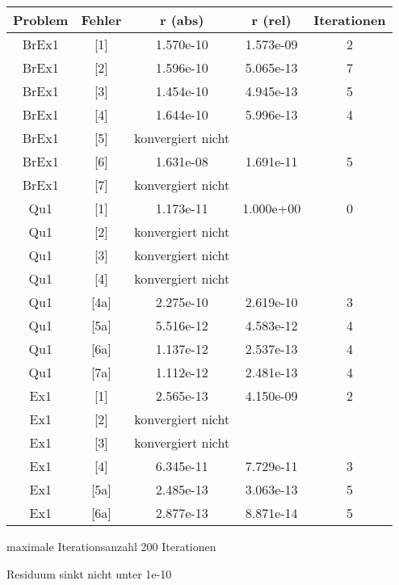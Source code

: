 \documentclass[a4paper,11pt]{article}
\begin{document}
\begin{tabular}{ccccc}
Problem & Fehler &  r (abs) & r (rel) & Iterationen  \\ 
\hline
BrEx1   & [1]    & 1.570e-10 & 1.573e-09 & 2  \\
BrEx1   & [2]    & 1.596e-10 &  5.065e-13 & 7  \\
BrEx1   & [3]    & 1.454e-10 &  4.945e-13 & 5  \\
BrEx1   & [4]    & 1.644e-10 &  5.996e-13 & 4  \\
BrEx1   & [5]    & konvergiert nicht\\
BrEx1   & [6]    & 1.631e-08 &  1.691e-11 & 5  \\
BrEx1   & [7]    & konvergiert nicht\\
\hline
Qu1  & [1] & 1.173e-11 & 1.000e+00 & 0\\
Qu1  & [2] & konvergiert  nicht \\
Qu1  & [3] & konvergiert nicht \\
Qu1  & [4] & konvergiert  nicht \\
Qu1  & [4a] & 2.275e-10 &  2.619e-10 & 3 \\
Qu1  & [5a] & 5.516e-12 &  4.583e-12 & 4 \\
Qu1  & [6a] & 1.137e-12 & 2.537e-13 & 4  \\
Qu1  & [7a] & 1.112e-12 &2.481e-13 &  4 \\
\hline
Ex1  &  [1] & 2.565e-13 & 4.150e-09 &2 \\
Ex1  &  [2] & konvergiert nicht & &  \\
Ex1  &  [3] & konvergiert nicht & &\\
Ex1  &  [4] & 6.345e-11 & 7.729e-11 & 3 \\
Ex1  &  [5a] & 2.485e-13 & 3.063e-13 & 5 \\
Ex1  &  [6a] & 2.877e-13 & 8.871e-14 & 5 
\end{tabular}

maximale Iterationsanzahl 200 Iterationen 

Residuum sinkt nicht unter 1e-10
\end{document}
